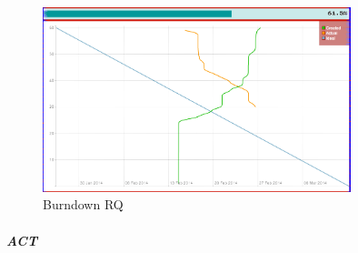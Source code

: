 	\begin{figure}[h]
		\centering \includegraphics[width=0.8\textwidth]{burndownRQ.png}
		\caption{Burndown RQ}
	\end{figure}
	
	
	\subparagraph{ACT}
	







